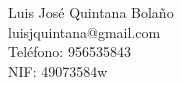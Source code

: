 Luis José Quintana Bolaño \\ %
luisjquintana@gmail.com \\ %
Teléfono: 956535843 \\ %
NIF: 49073584w \\ %